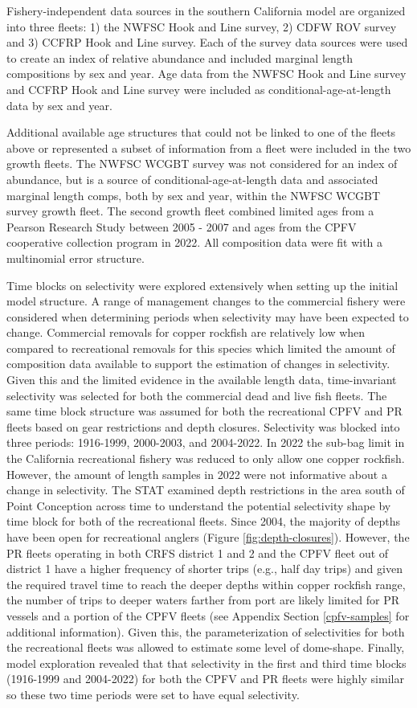 \documentclass[11pt,
  english,
  letterpaper,
]{article}
\begin{document}
Fishery-independent data sources in the southern California model are organized into three fleets: 1) the NWFSC Hook and Line survey, 2) CDFW ROV survey and 3) CCFRP Hook and Line survey. Each of the survey data sources were used to create an index of relative abundance and included marginal length compositions by sex and year. Age data from the NWFSC Hook and Line survey and CCFRP Hook and Line survey were included as conditional-age-at-length data by sex and year.

Additional available age structures that could not be linked to one of the fleets above or represented a subset of information from a fleet were included in the two growth fleets. The NWFSC WCGBT survey was not considered for an index of abundance, but is a source of conditional-age-at-length data and associated marginal length comps, both by sex and year, within the NWFSC WCGBT survey growth fleet. The second growth fleet combined limited ages from a Pearson Research Study between 2005 - 2007 and ages from the CPFV cooperative collection program in 2022. All composition data were fit with a multinomial error structure.

Time blocks on selectivity were explored extensively when setting up the initial model structure. A range of management changes to the commercial fishery were considered when determining periods when selectivity may have been expected to change. Commercial removals for copper rockfish are relatively low when compared to recreational removals for this species which limited the amount of composition data available to support the estimation of changes in selectivity. Given this and the limited evidence in the available length data, time-invariant selectivity was selected for both the commercial dead and live fish fleets. The same time block structure was assumed for both the recreational CPFV and PR fleets based on gear restrictions and depth closures. Selectivity was blocked into three periods: 1916-1999, 2000-2003, and 2004-2022. In 2022 the sub-bag limit in the California recreational fishery was reduced to only allow one copper rockfish. However, the amount of length samples in 2022 were not informative about a change in selectivity. The STAT examined depth restrictions in the area south of Point Conception across time to understand the potential selectivity shape by time block for both of the recreational fleets. Since 2004, the majority of depths have been open for recreational anglers (Figure \ref{fig:depth-closures}). However, the PR fleets operating in both CRFS district 1 and 2 and the CPFV fleet out of district 1 have a higher frequency of shorter trips (e.g., half day trips) and given the required travel time to reach the deeper depths within copper rockfish range, the number of trips to deeper waters farther from port are likely limited for PR vessels and a portion of the CPFV fleets (see Appendix Section \ref{cpfv-samples} for additional information). Given this, the parameterization of selectivities for both the recreational fleets was allowed to estimate some level of dome-shape. Finally, model exploration revealed that that selectivity in the first and third time blocks (1916-1999 and 2004-2022) for both the CPFV and PR fleets were highly similar so these two time periods were set to have equal selectivity.
\end{document}
